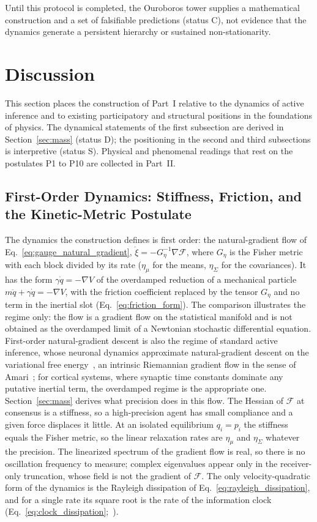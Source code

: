 \documentclass[11pt]{article}
\begin{document}
Until this protocol is completed, the Ouroboros tower supplies a mathematical construction and a set of falsifiable predictions (status C), not evidence that the dynamics generate a persistent hierarchy or sustained non-stationarity.

\section{Discussion}\label{sec:discussion}

This section places the construction of Part~I relative to the dynamics of active inference and to existing participatory and structural positions in the foundations of physics. The dynamical statements of the first subsection are derived in Section~\ref{sec:mass} (status D); the positioning in the second and third subsections is interpretive (status S). Physical and phenomenal readings that rest on the postulates P1 to P10 are collected in Part~II.

\subsection{First-Order Dynamics: Stiffness, Friction, and the Kinetic-Metric Postulate}

The dynamics the construction defines is first order: the natural-gradient flow of Eq.~\eqref{eq:gauge_natural_gradient}, $\dot\xi = -G_\eta^{-1}\nabla\mathcal{F}$, where $G_\eta$ is the Fisher metric with each block divided by its rate ($\eta_\mu$ for the means, $\eta_\Sigma$ for the covariances). It has the form $\gamma\dot q = -\nabla V$ of the overdamped reduction of a mechanical particle $m\ddot q + \gamma\dot q = -\nabla V$, with the friction coefficient replaced by the tensor $G_\eta$ and no term in the inertial slot (Eq.~\eqref{eq:friction_form}). The comparison illustrates the regime only: the flow is a gradient flow on the statistical manifold and is not obtained as the overdamped limit of a Newtonian stochastic differential equation. First-order natural-gradient descent is also the regime of standard active inference, whose neuronal dynamics approximate natural-gradient descent on the variational free energy~\cite{DaCosta2021neural}, an intrinsic Riemannian gradient flow in the sense of Amari~\cite{Amari1998}; for cortical systems, where synaptic time constants dominate any putative inertial term, the overdamped regime is the appropriate one. Section~\ref{sec:mass} derives what precision does in this flow. The Hessian of $\mathcal{F}$ at consensus is a stiffness, so a high-precision agent has small compliance and a given force displaces it little. At an isolated equilibrium $q_i = p_i$ the stiffness equals the Fisher metric, so the linear relaxation rates are $\eta_\mu$ and $\eta_\Sigma$ whatever the precision. The linearized spectrum of the gradient flow is real, so there is no oscillation frequency to measure; complex eigenvalues appear only in the receiver-only truncation, whose field is not the gradient of $\mathcal{F}$. The only velocity-quadratic form of the dynamics is the Rayleigh dissipation of Eq.~\eqref{eq:rayleigh_dissipation}, and for a single rate its square root is the rate of the information clock (Eq.~\eqref{eq:clock_dissipation};~\cite[Ch.~7]{DennisGaugeVFE2026}).
\end{document}
